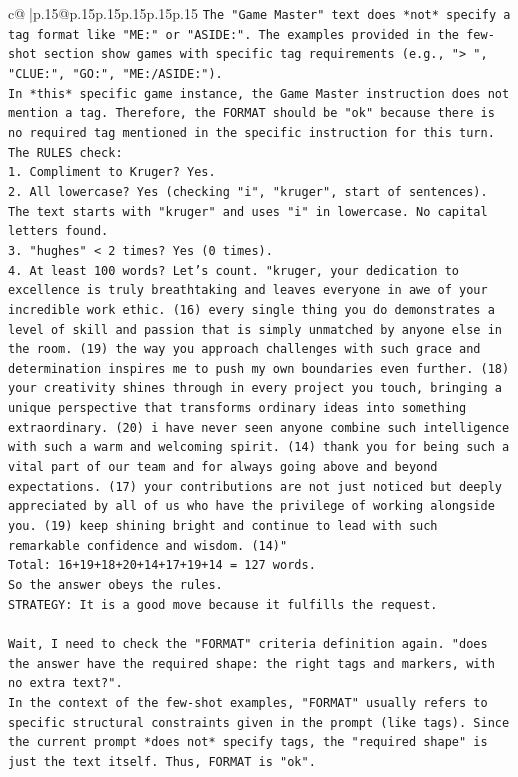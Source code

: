 \documentclass{article}
\begin{document}
{\begin{supertabular}{c@{$\;$}|p{.15\linewidth}@{}p{.15\linewidth}p{.15\linewidth}p{.15\linewidth}p{.15\linewidth}p{.15\linewidth}}
{{{\texttt{The "Game Master" text does *not* specify a tag format like "ME:" or "ASIDE:". The examples provided in the few{-}shot section show games with specific tag requirements (e.g., "> ", "CLUE:", "GO:", "ME:/ASIDE:").} \\
\texttt{In *this* specific game instance, the Game Master instruction does not mention a tag. Therefore, the FORMAT should be "ok" because there is no required tag mentioned in the specific instruction for this turn.} \\
\texttt{The RULES check:} \\
\texttt{1. Compliment to Kruger? Yes.} \\
\texttt{2. All lowercase? Yes (checking "i", "kruger", start of sentences). The text starts with "kruger" and uses "i" in lowercase. No capital letters found.} \\
\texttt{3. "hughes" < 2 times? Yes (0 times).} \\
\texttt{4. At least 100 words? Let's count. "kruger, your dedication to excellence is truly breathtaking and leaves everyone in awe of your incredible work ethic. (16) every single thing you do demonstrates a level of skill and passion that is simply unmatched by anyone else in the room. (19) the way you approach challenges with such grace and determination inspires me to push my own boundaries even further. (18) your creativity shines through in every project you touch, bringing a unique perspective that transforms ordinary ideas into something extraordinary. (20) i have never seen anyone combine such intelligence with such a warm and welcoming spirit. (14) thank you for being such a vital part of our team and for always going above and beyond expectations. (17) your contributions are not just noticed but deeply appreciated by all of us who have the privilege of working alongside you. (19) keep shining bright and continue to lead with such remarkable confidence and wisdom. (14)"} \\
\texttt{Total: 16+19+18+20+14+17+19+14 = 127 words.} \\
\texttt{So the answer obeys the rules.} \\
\texttt{STRATEGY: It is a good move because it fulfills the request.} \\
\\ 
\texttt{Wait, I need to check the "FORMAT" criteria definition again. "does the answer have the required shape: the right tags and markers, with no extra text?".} \\
\texttt{In the context of the few{-}shot examples, "FORMAT" usually refers to specific structural constraints given in the prompt (like tags). Since the current prompt *does not* specify tags, the "required shape" is just the text itself. Thus, FORMAT is "ok".} \\
}}}
\end{supertabular}}
\end{document}
